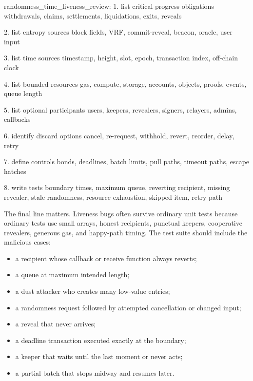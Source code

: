 \begin{codeblock}
randomness_time_liveness_review:
    1. list critical progress obligations
       withdrawals, claims, settlements, liquidations, exits, reveals

    2. list entropy sources
       block fields, VRF, commit-reveal, beacon, oracle, user input

    3. list time sources
       timestamp, height, slot, epoch, transaction index, off-chain clock

    4. list bounded resources
       gas, compute, storage, accounts, objects, proofs, events, queue length

    5. list optional participants
       users, keepers, revealers, signers, relayers, admins, callbacks

    6. identify discard options
       cancel, re-request, withhold, revert, reorder, delay, retry

    7. define controls
       bonds, deadlines, batch limits, pull paths, timeout paths, escape hatches

    8. write tests
       boundary times, maximum queue, reverting recipient, missing revealer,
       stale randomness, resource exhaustion, skipped item, retry path
\end{codeblock}

The final line matters. Liveness bugs often survive ordinary unit tests because ordinary tests use small arrays, honest recipients, punctual keepers, cooperative revealers, generous gas, and happy-path timing. The test suite should include the malicious cases:

\begin{itemize}
\item a recipient whose callback or receive function always reverts;
\item a queue at maximum intended length;
\item a dust attacker who creates many low-value entries;
\item a randomness request followed by attempted cancellation or changed input;
\item a reveal that never arrives;
\item a deadline transaction executed exactly at the boundary;
\item a keeper that waits until the last moment or never acts;
\item a partial batch that stops midway and resumes later.
\end{itemize}

